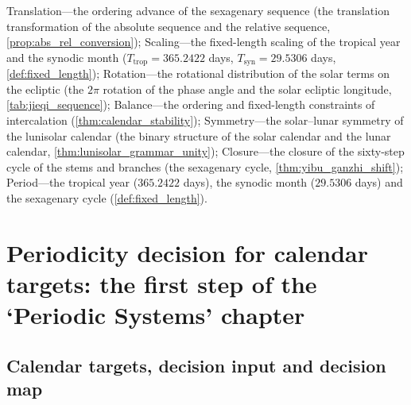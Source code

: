 \begin{remark}\label{rem:calendar_seven_themes}
Translation---the ordering advance of the sexagenary sequence (the translation transformation of the absolute sequence and the relative sequence, \cref{prop:abs_rel_conversion});
Scaling---the fixed-length scaling of the tropical year and the synodic month (\(T_{\text{trop}}=365.2422\) days, \(T_{\text{syn}}=29.5306\) days, \cref{def:fixed_length});
Rotation---the rotational distribution of the solar terms on the ecliptic (the \(2\pi\) rotation of the phase angle and the solar ecliptic longitude, \cref{tab:jieqi_sequence});
Balance---the ordering and fixed-length constraints of intercalation (\cref{thm:calendar_stability});
Symmetry---the solar--lunar symmetry of the lunisolar calendar (the binary structure of the solar calendar and the lunar calendar, \cref{thm:lunisolar_grammar_unity});
Closure---the closure of the sixty-step cycle of the stems and branches (the sexagenary cycle, \cref{thm:yibu_ganzhi_shift});
Period---the tropical year (\(365.2422\) days), the synodic month (\(29.5306\) days) and the sexagenary cycle (\cref{def:fixed_length}).
\end{remark}

\section{Periodicity decision for calendar targets: the first step of the `Periodic Systems' chapter}
\label{sec:calendar_periodicity_decision}

\subsection{Calendar targets, decision input and decision map}


